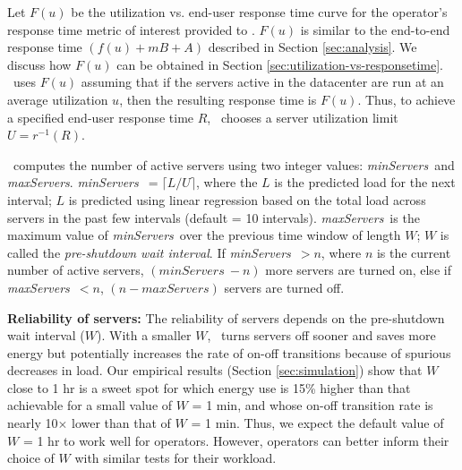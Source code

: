 \newcommand{\minServers}{\textit{minServers}}
\newcommand{\maxServers}{\textit{maxServers}}

Let $F(u)$ be the utilization vs. end-user response time curve for the operator's response time metric of interest provided to \shrink. $F(u)$ is similar to the end-to-end response time $(f(u) + mB + A)$ described in Section \ref{sec:analysis}. We discuss how $F(u)$ can be obtained in Section \ref{sec:utilization-vs-responsetime}.  \shrink\ uses $F(u)$ assuming that if the servers active in the datacenter are run at an average utilization $u$, then the resulting response time is $F(u)$. Thus, to achieve a specified end-user response time $R$, \shrink\ chooses a server utilization limit $U = r^{-1}(R)$.


\shrink\ computes the number of active servers using two integer values: \minServers\ and \maxServers. \minServers\ $= \lceil L/U \rceil$, where the $L$ is the predicted load for the next interval; $L$ is predicted using linear regression based on the total load across servers in the past few intervals (default = 10 intervals). \maxServers\ is the maximum value of \minServers\ over the previous time window of length $W$; $W$ is called the \emph{pre-shutdown wait interval}. If \minServers\ $ > n$, where $n$ is the current number of active servers, $(\minServers\ - n)$ more servers are turned on, else if  \maxServers\ $ < n$,  $(n - \maxServers)$ servers are turned off.  



\textbf{Reliability of servers:} The reliability of servers depends on the pre-shutdown wait interval ($W$). With a smaller $W$, \shrink\  turns servers off sooner and saves more energy but potentially increases the rate of on-off transitions because of spurious decreases in load.   Our empirical results (Section \ref{sec:simulation})  show that $W$ close to 1 hr is a sweet spot for which energy use is 15\% higher than that achievable for a small value of $W$ = 1 min, and whose on-off transition rate is  nearly 10$\times$ lower than that of $W$ = 1 min. Thus, we expect the default value of $W$ = 1 hr to work well for operators. However, operators can better inform their choice of $W$ with similar tests for their workload.

